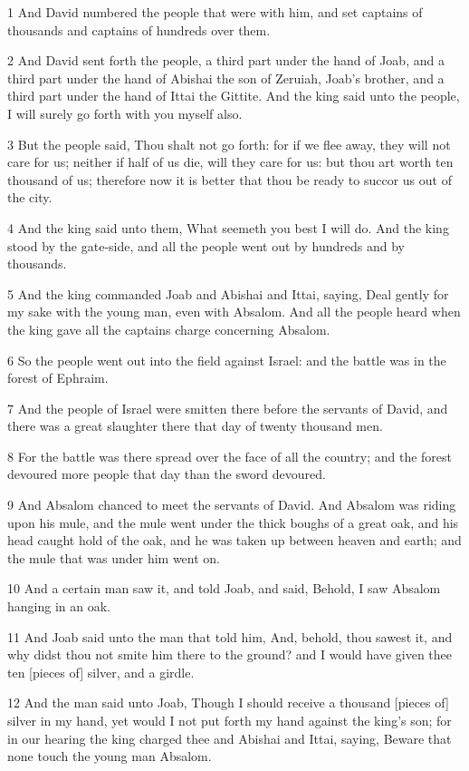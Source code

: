 \par 1 And David numbered the people that were with him, and set captains of thousands and captains of hundreds over them.
\par 2 And David sent forth the people, a third part under the hand of Joab, and a third part under the hand of Abishai the son of Zeruiah, Joab's brother, and a third part under the hand of Ittai the Gittite. And the king said unto the people, I will surely go forth with you myself also.
\par 3 But the people said, Thou shalt not go forth: for if we flee away, they will not care for us; neither if half of us die, will they care for us: but thou art worth ten thousand of us; therefore now it is better that thou be ready to succor us out of the city.
\par 4 And the king said unto them, What seemeth you best I will do. And the king stood by the gate-side, and all the people went out by hundreds and by thousands.
\par 5 And the king commanded Joab and Abishai and Ittai, saying, Deal gently for my sake with the young man, even with Absalom. And all the people heard when the king gave all the captains charge concerning Absalom.
\par 6 So the people went out into the field against Israel: and the battle was in the forest of Ephraim.
\par 7 And the people of Israel were smitten there before the servants of David, and there was a great slaughter there that day of twenty thousand men.
\par 8 For the battle was there spread over the face of all the country; and the forest devoured more people that day than the sword devoured.
\par 9 And Absalom chanced to meet the servants of David. And Absalom was riding upon his mule, and the mule went under the thick boughs of a great oak, and his head caught hold of the oak, and he was taken up between heaven and earth; and the mule that was under him went on.
\par 10 And a certain man saw it, and told Joab, and said, Behold, I saw Absalom hanging in an oak.
\par 11 And Joab said unto the man that told him, And, behold, thou sawest it, and why didst thou not smite him there to the ground? and I would have given thee ten [pieces of] silver, and a girdle.
\par 12 And the man said unto Joab, Though I should receive a thousand [pieces of] silver in my hand, yet would I not put forth my hand against the king's son; for in our hearing the king charged thee and Abishai and Ittai, saying, Beware that none touch the young man Absalom.
